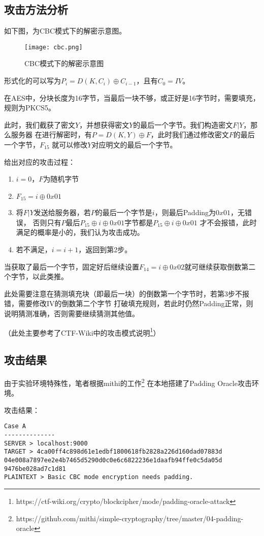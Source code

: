 \subsection{攻击方法分析}

如下图，为CBC模式下的解密示意图。

\begin{figure}[!htbp]
    \centering
    \texttt{[image: cbc.png]}
    \caption{CBC模式下的解密示意图}
\end{figure}
 
形式化的可以写为$P_i = D(K,C_i) \oplus C_{i-1}$，且有$C_0 = IV$。

在AES中，分块长度为16字节，当最后一块不够，或正好是16字节时，需要填充，规则为PKCS5。

此时，我们截获了密文$Y$，并想获得密文$Y$的最后一个字节。我们构造密文$F|Y$，那么服务器
在进行解密时，有$P=D(K,Y)\oplus F$，此时我们通过修改密文$F$的最后一个字节，$F_{15}$
就可以修改$Y$对应明文的最后一个字节。

给出对应的攻击过程：
\begin{enumerate}
    \item $i = 0$，$F$为随机字节
    \item $F_{15} = i \oplus 0x01$
    \item 将$F|Y$发送给服务器，若$P$的最后一个字节是$i$，则最后Padding为$0x01$，无错误，
    否则只有$P$最后$P_{15} \oplus i \oplus 0x01$字节都是$P_{15} \oplus i \oplus 0x01$
    才不会报错，此时满足的概率是小的，我们认为攻击成功。
    \item 若不满足，$i = i+1$，返回到第2步。
\end{enumerate}

当获取了最后一个字节，固定好后继续设置$F_{14}=i\oplus 0x02$就可继续获取倒数第二个字节，以此类推。

此处需要注意在猜测填充块（即最后一块）的倒数第一个字节时，若第3步不报错，需要修改IV的倒数第二个字节
打破填充规则，若此时仍然Padding正常，则说明猜测准确，否则需要继续猜测其他值。

（此处主要参考了CTF-Wiki中的攻击模式说明\footnote{https://ctf-wiki.org/crypto/blockcipher/mode/padding-oracle-attack}）

\subsection{攻击结果}
由于实验环境特殊性，笔者根据mithi的工作\footnote{https://github.com/mithi/simple-cryptography/tree/master/04-padding-oracle}
在本地搭建了Padding Oracle攻击环境。

攻击结果：
\begin{lstlisting}
Case A
--------------
SERVER > localhost:9000
TARGET > 4ca00ff4c898d61e1edbf1800618fb2828a226d160dad07883d
04e008a7897ee2e4b7465d5290d0c0e6c6822236e1daafb94ffe0c5da05d
9476be028ad7c1d81
PLAINTEXT > Basic CBC mode encryption needs padding.
\end{lstlisting}